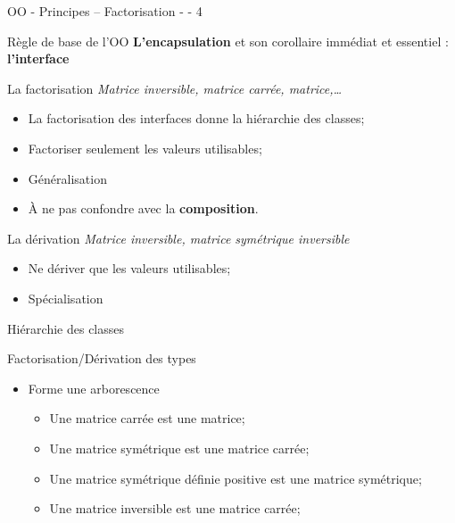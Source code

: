 \documentclass[handout,10pt]{beamer}
\begin{document}
\begin{frame}{OO - Principes -- Factorisation - - 4}
\begin{block}{Règle de base de l'OO}
\textbf{L'encapsulation} et son corollaire immédiat et essentiel : \textbf{l'interface}
\end{block}

\begin{block}{La factorisation}
\textsl{Matrice inversible, matrice carrée, matrice,\ldots}\\
\begin{itemize}
\item La factorisation des interfaces donne la hiérarchie des classes;
\item Factoriser seulement les valeurs utilisables;
\item Généralisation
\item À ne pas confondre avec la \textbf{composition}.
\end{itemize}
\end{block}

\begin{block}{La dérivation}
\textsl{Matrice inversible, matrice symétrique inversible}
\begin{itemize}
\item Ne dériver que les valeurs utilisables;
\item Spécialisation
\end{itemize}
\end{block}
\end{frame}

\begin{frame}[fragile]{Hiérarchie des classes}
\begin{block}{Factorisation/Dérivation des types}
\begin{itemize}
\item Forme une arborescence 
\begin{itemize}
\item Une matrice carrée est une matrice;
\item Une matrice symétrique est une matrice carrée;
\item Une matrice symétrique définie positive est une matrice symétrique;
\item Une matrice inversible est une matrice carrée; 
\end{itemize}
\end{itemize}
\end{block}
\end{frame}
\end{document}
